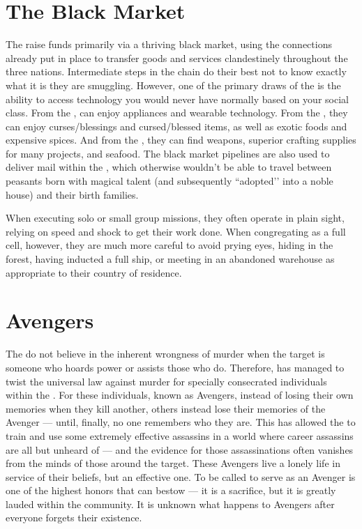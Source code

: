 \documentclass[blue]{GL2020}
\begin{document}
\section*{The Black Market}
The \pGoaties{} raise funds primarily via a thriving black market, using the connections already put in place to transfer goods and services clandestinely throughout the three nations. Intermediate steps in the chain do their best not to know exactly what it is they are smuggling. However, one of the primary draws of the \pGoaties{} is the ability to access technology you would never have normally based on your social class. From the \pTech{}, \pGoaties{} can enjoy appliances and wearable technology. From the \pFarm{}, they can enjoy curses/blessings and cursed/blessed items, as well as exotic foods and expensive spices. And from the \pShip{}, they can find weapons, superior crafting supplies for many projects, and seafood. The black market pipelines are also used to deliver mail within the \pFarm{}, which otherwise wouldn't be able to travel between peasants born with magical talent (and subsequently ``adopted'’ into a noble house) and their birth families.

When executing solo or small group missions, they often operate in plain sight, relying on speed and shock to get their work done. When congregating as a full cell, however, they are much more careful to avoid prying eyes, hiding in the forest, having inducted a full ship, or meeting in an abandoned warehouse as appropriate to their country of residence.

\section*{Avengers}
The \pGoaties{} do not believe in the inherent wrongness of murder when the target is someone who hoards power or assists those who do. Therefore, \cGenesis{} has managed to twist the universal law against murder for specially consecrated individuals within the \pGoaties{}. For these individuals, known as Avengers, instead of losing their own memories when they kill another, others instead lose their memories of the Avenger — until, finally, no one remembers who they are. This has allowed the \pGoaties{} to train and use some extremely effective assassins in a world where career assassins are all but unheard of — and the evidence for those assassinations often vanishes from the minds of those around the target. These Avengers live a lonely life in service of their beliefs, but an effective one. To be called to serve as an Avenger is one of the highest honors that \cGenesis{} can bestow — it is a sacrifice, but it is greatly lauded within the community. It is unknown what happens to Avengers after everyone forgets their existence.
\end{document}
